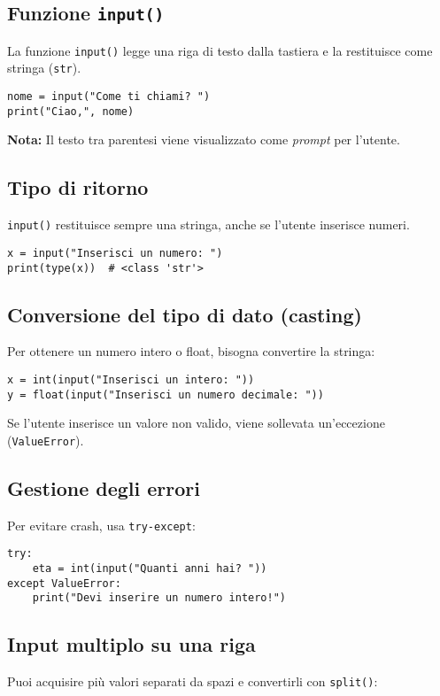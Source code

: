 \documentclass[a4paper,12pt]{article}
\begin{document}
\subsection*{Funzione \texttt{input()}}
La funzione \texttt{input()} legge una riga di testo dalla tastiera e la restituisce come stringa (\texttt{str}).

\begin{lstlisting}
nome = input("Come ti chiami? ")
print("Ciao,", nome)
\end{lstlisting}

\textbf{Nota:} Il testo tra parentesi viene visualizzato come \textit{prompt} per l'utente.

\subsection*{Tipo di ritorno}
\texttt{input()} restituisce sempre una stringa, anche se l'utente inserisce numeri.

\begin{lstlisting}
x = input("Inserisci un numero: ")
print(type(x))  # <class 'str'>
\end{lstlisting}

\subsection*{Conversione del tipo di dato (casting)}
Per ottenere un numero intero o float, bisogna convertire la stringa:

\begin{lstlisting}
x = int(input("Inserisci un intero: "))
y = float(input("Inserisci un numero decimale: "))
\end{lstlisting}

Se l'utente inserisce un valore non valido, viene sollevata un'eccezione (\texttt{ValueError}).

\subsection*{Gestione degli errori}
Per evitare crash, usa \texttt{try-except}:

\begin{lstlisting}
try:
    eta = int(input("Quanti anni hai? "))
except ValueError:
    print("Devi inserire un numero intero!")
\end{lstlisting}

\subsection*{Input multiplo su una riga}
Puoi acquisire più valori separati da spazi e convertirli con \texttt{split()}:
\end{document}
